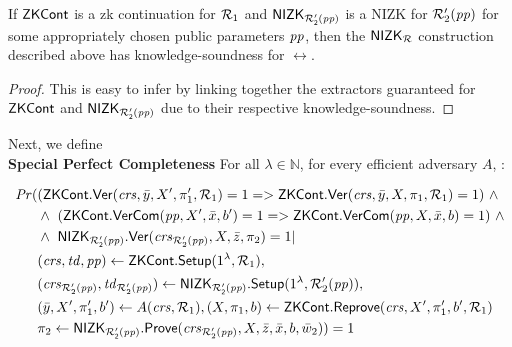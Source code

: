 \begin{lemma} 
\label{le:KS_for_nizkR}
If ${\mathsf{ZKCont}}$ is a zk continuation for $\mathcal{R}_1$ and ${\mathsf{NIZK_{\mathcal{R}'_2(\mathit{pp})}}}$ is a NIZK for $\mathcal{R}_2'(\mathit{pp})$ for some appropriately chosen public parameters $\mathit{pp}$, 
then the ${\mathsf{NIZK_{\mathcal{R}}}}$ construction described above has knowledge-soundness for $\rel$. 
\end{lemma} 
\begin{proof}This is easy to infer by linking together the extractors guaranteed for ${\mathsf{ZKCont}}$ and ${\mathsf{NIZK_{\mathcal{R}'_2(\mathit{pp})}}}$ due to their respective 
knowledge-soundness.
\end{proof}
 
\noindent Next, we define \\ 
\noindent \textbf{Special Perfect Completeness} For all $\lambda \in \mathbb{N}$, for every efficient adversary $A$, :


 
\begin{align*}
\mathit{Pr} (& (\ZKCont.\Verify(\crs, \bar{y}, X', \pi'_1, \relone) = 1  = >  \ZKCont.\Verify(\crs, \bar{y}, X, \pi_1, \relone) = 1)  \ \wedge \  \\
                   & \wedge \ (\ZKCont.\VerifyCom (\pp, X', \barx, b') = 1 => \ZKCont.\VerifyCom (\pp, X, \barx, b) = 1) \ \wedge \\
                   & \wedge \ \nizktwo.\Verify(\crstwo, X, \barz, \pi_2) =1 | \\
                   & (\crs, \tw, \pp) \leftarrow \ZKCont.\Setup (1^{\lambda}, \relone),  \\ 
                   & (\crstwo, \twtwo) \leftarrow \nizktwo.\Setup(1^{\lambda}, \reltwo'(\pp)),  \\
                   & (\bary, X', \pi'_1, b') \leftarrow A(\crs,\relone), (X, \pi_1, b) \leftarrow \ZKCont.\Reprove(\crs, X', \pi'_1, b', \relone) \\
                   &\pi_2 \leftarrow \nizktwo.\Prove(\crstwo, X, \barz, \barx, b, \baromega_2)) = 1
\end{align*}

